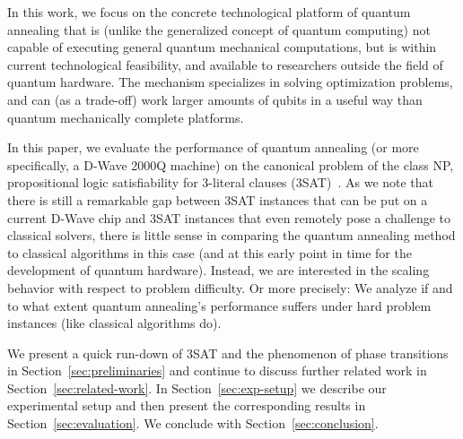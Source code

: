 In this work, we focus on the concrete technological platform of quantum annealing that is (unlike the generalized concept of quantum computing) not capable of executing general quantum mechanical computations, but is within current technological feasibility, and available to researchers outside the field of quantum hardware. The mechanism specializes in solving optimization problems, and can (as a trade-off) work larger amounts of qubits in a useful way than quantum mechanically complete platforms.

In this paper, we evaluate the performance of quantum annealing (or more specifically, a D-Wave 2000Q machine) on the canonical problem of the class NP, propositional logic satisfiability for 3-literal clauses (3SAT)~\cite{cook1971complexity}. As we note that there is still a remarkable gap between 3SAT instances that can be put on a current D-Wave chip and 3SAT instances that even remotely pose a challenge to classical solvers, there is little sense in comparing the quantum annealing method to classical algorithms in this case (and at this early point in time for the development of quantum hardware). Instead, we are interested in the scaling behavior with respect to problem difficulty. Or more precisely: We analyze if and to what extent quantum annealing's performance suffers under hard problem instances (like classical algorithms do).

We present a quick run-down of 3SAT and the phenomenon of phase transitions in Section~\ref{sec:preliminaries} and continue to discuss further related work in Section~\ref{sec:related-work}. In Section~\ref{sec:exp-setup} we describe our experimental setup and then present the corresponding results in Section~\ref{sec:evaluation}. We conclude with Section~\ref{sec:conclusion}.
